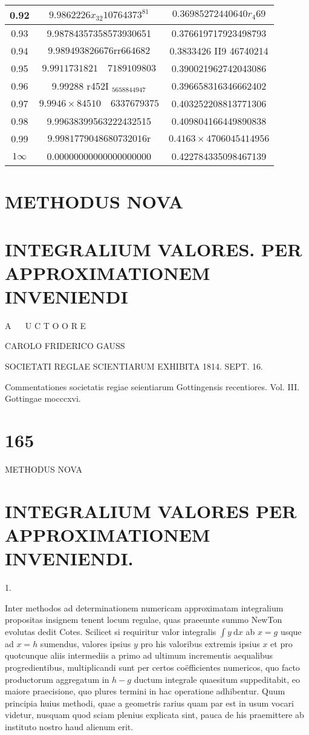 \documentclass[10pt]{article}
\begin{document}
\begin{center}
\begin{tabular}{|c|c|c|}
\hline
0.92 & \(9.9862226 x_{32} 10764373^{81}\) & \(0.36985272440640 r_{4} 69\) \\
\hline
0.93 & 9.98784357358573930651 & 0.376619717923498793 \\
\hline
0.94 & \(9.989493826676 \mathrm{rr} 664682\) & 0.3833426 II9 46740214 \\
\hline
0.95 & \(9.9911731821 \quad 7189109803\) & 0.390021962742043086 \\
\hline
0.96 & 9.99288 r452I \(_{5658844947}\) & 0.396658316346662402 \\
\hline
0.97 & \(9.9946 \times 84510 \quad 6337679375\) & 0.403252208813771306 \\
\hline
0.98 & 9.99638399563222432515 & 0.409804166449890838 \\
\hline
0.99 & \(9.9981779048680732016 \mathrm{r}\) & \(0.4163 \times 4706045414956\) \\
\hline
\(1 \infty\) & 0.00000000000000000000 & 0.422784335098467139 \\
\hline
\end{tabular}
\end{center}

\section*{METHODUS NOVA}
\section*{INTEGRALIUM VALORES. 
 PER APPROXIMATIONEM INVENIENDI}
A \(\quad\) U C T O O R E

CAROLO FRIDERICO GAUSS

SOCIETATI REGLAE SCIENTIARUM EXHIBITA 1814. SEPT. 16.

Commentationes societatis regiae seientiarum Gottingensis recentiores. Vol. III. Gottingae mocccxvi.

\section*{165}
METHODUS NOVA

\section*{INTEGRALIUM VALORES 
 PER APPROXIMATIONEM INVENIENDI.}
1.

Inter methodos ad determinationem numericam approximatam integralium propositas insignem tenent locum regulae, quas praeeunte summo NewTon evolutas dedit Cotes. Scilicet si requiritur valor integralis \(\int y \mathrm{~d} x\) ab \(x=g\) usque ad \(x=h\) sumendus, valores ipsius \(y\) pro his valoribus extremis ipsius \(x\) et pro quotcunque aliis intermediis a primo ad ultimum incrementis aequalibus progredientibus, multiplicandi sunt per certos coëfficientes numericos, quo facto productorum aggregatum in \(h-g\) ductum integrale quaesitum suppeditabit, eo maiore praecisione, quo plures termini in hac operatione adhibentur. Quum principia huius methodi, quae a geometris rarius quam par est in usum vocari videtur, nusquam quod sciam plenius explicata sint, pauca de his praemittere ab instituto nostro haud alienum erit.
\end{document}
